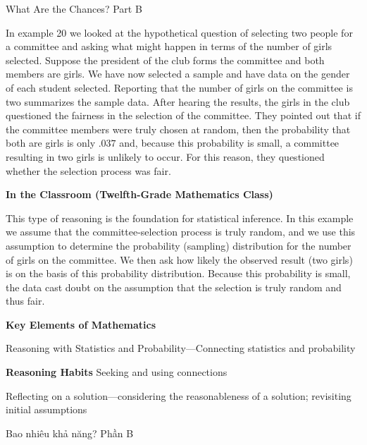 \documentclass[
  10pt,
  a4paper,
  landscape,
  twoside,
  openany
]{scrbook}
\newcounter{example}
\begin{document}
\TriExample
{What Are the Chances? Part B}
{
In example 20 we looked at the hypothetical question of selecting two people for a committee and asking what might happen in terms of the number of girls selected. Suppose the president of the club forms the committee and both members are girls. We have now selected a sample and have data on the gender of each student selected. Reporting that the number of girls on the committee is two summarizes the sample data. After hearing the results, the girls in the club questioned the fairness in the selection of the committee. They pointed out that if the committee members were truly chosen at random, then the probability that both are girls is only $.037$ and, because this probability is small, a committee resulting in two girls is unlikely to occur. For this reason, they questioned whether the selection process was fair.

\noindent
\textbf{In the Classroom (Twelfth-Grade Mathematics Class)}

This type of reasoning is the foundation for statistical inference. In this example we assume that the committee-selection process is truly random, and we use this assumption to determine the probability (sampling) distribution for the number of girls on the committee. We then ask how likely the observed result (two girls) is on the basis of this probability distribution. Because this probability is small, the data cast doubt on the assumption that the selection is truly random and thus fair.

\noindent
\textbf{Key Elements of Mathematics}

Reasoning with Statistics and Probability---Connecting statistics and probability

\noindent
\textbf{Reasoning Habits}
Seeking and using connections

Reflecting on a solution---considering the reasonableness of a solution; revisiting initial assumptions
}
{Bao nhiêu khả năng? Phần B}
\end{document}
